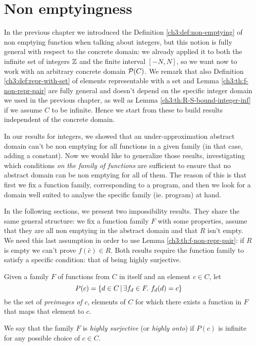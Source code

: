 \section{Non emptyingness}
In the previous chapter we introduced the Definition \ref{ch3:def:non-emptying} of non emptying function when talking about integers, but this notion is fully general with respect to the concrete domain: we already applied it to both the infinite set of integers $\mathbb{Z}$ and the finite interval $[-N, N]$, so we want now to work with an arbitrary concrete domain $\mathcal{P}(C)$.
We remark that also Definition \ref{ch3:def:repr-with-set} of elements representable with a set and Lemma \ref{ch3:th:f-non-repr-pair} are fully general and doesn't depend on the specific integer domain we used in the previous chapter, as well as Lemma \ref{ch3:th:R-S-bound-integer-inf} if we assume $C$ to be infinite. Hence we start from these to build results independent of the concrete domain.

In our results for integers, we showed that an under-approximation abstract domain can't be non emptying for all functions in a given family (in that case, adding a constant). Now we would like to generalize those results, investigating which conditions \textit{on the family of functions} are sufficient to ensure that no abstract domain can be non emptying for all of them. The reason of this is that first we fix a function family, corresponding to a program, and then we look for a domain well suited to analyse the specific family (ie. program) at hand.

In the following sections, we present two impossibility results. They share the same general structure: we fix a function family $F$ with some properties, assume that they are all non emptying in the abstract domain and that $R$ isn't empty. We need this last assumption in order to use Lemma \ref{ch3:th:f-non-repr-pair}: if $R$ is empty we can't prove $f(\bar{c}) \in R$.
Both results require the function family to satisfy a specific condition: that of being highly surjective.

\begin{definition}\label{ch4:def:highly-onto-func-family}
	Given a family $F$ of functions from $C$ in itself and an element $c \in C$, let
	\[
	P(c) = \{ d \in C \,\vert\, \exists f_d \in F .\ f_d(d) = c \}
	\]
	be the set of \textit{preimages of $c$}, elements of $C$ for which there exists a function in $F$ that maps that element to $c$.

	We say that the family $F$ is \textit{highly surjective} (or \textit{highly onto}) if $P(c)$ is infinite for any possible choice of $c \in C$.
\end{definition}

